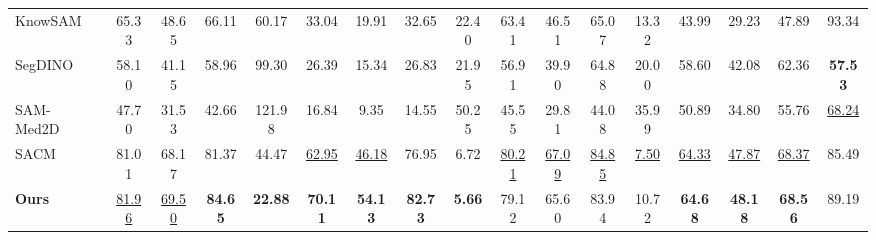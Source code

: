 \begin{table}[t]
\begin{tabular*}{\textwidth}{@{\extracolsep{\fill}}lcccccccccccccccc@{}}
KnowSAM~\cite{huang2025knowsam} & 65.33 & 48.65 & 66.11 & 60.17 & 33.04 & 19.91 & 32.65 & 22.40 & 63.41 & 46.51 & 65.07 & 13.32 & 43.99 & 29.23 & 47.89 & 93.34 \\
SegDINO~\cite{yang2025segdino} & 58.10 & 41.15 & 58.96 & 99.30 & 26.39 & 15.34 & 26.83 & 21.95 & 56.91 & 39.90 & 64.88 & 20.00 & 58.60 & 42.08 & 62.36 & \textcolor{red!80!black}{\textbf{57.53}} \\
SAM-Med2D~\cite{cheng2023sammed2d} & 47.70 & 31.53 & 42.66 & 121.98 & 16.84 & 9.35 & 14.55 & 50.25 & 45.55 & 29.81 & 44.08 & 35.99 & 50.89 & 34.80 & 55.76 & \underline{68.24} \\
SACM~\cite{zhu2026sacm} & 81.01 & 68.17 & 81.37 & 44.47 & \underline{62.95} & \underline{46.18} & 76.95 & 6.72 & \underline{80.21} & \underline{67.09} & \underline{84.85} & \underline{7.50} & \underline{64.33} & \underline{47.87} & \underline{68.37} & 85.49 \\
\midrule
\textbf{Ours} & \underline{81.96} & \underline{69.50} & \textcolor{red!80!black}{\textbf{84.65}} & \textcolor{red!80!black}{\textbf{22.88}} & \textcolor{red!80!black}{\textbf{70.11}} & \textcolor{red!80!black}{\textbf{54.13}} & \textcolor{red!80!black}{\textbf{82.73}} & \textcolor{red!80!black}{\textbf{5.66}} & 79.12 & 65.60 & 83.94 & 10.72 & \textcolor{red!80!black}{\textbf{64.68}} & \textcolor{red!80!black}{\textbf{48.18}} & \textcolor{red!80!black}{\textbf{68.56}} & 89.19 \\
\bottomrule
\end{tabular*}
\end{table}

